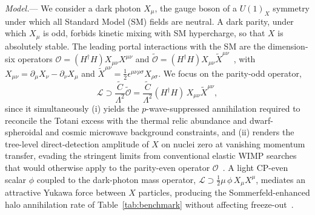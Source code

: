 \documentclass[aps,prl,twocolumn,superscriptaddress,nofootinbib]{revtex4-2}
\begin{document}
\textit{Model.}---%
We consider a dark photon $X_\mu$, the gauge boson of a $U(1)_X$ symmetry
under which all Standard Model (SM) fields are neutral. A dark parity,
under which $X_\mu$ is odd, forbids kinetic mixing with SM hypercharge, so
that $X$ is absolutely stable. The leading portal interactions with the SM
are the dimension-six operators $\mathcal{O}=(H^\dagger
H)X_{\mu\nu}X^{\mu\nu}$ and $\tilde{\mathcal
O}=(H^\dagger H)X_{\mu\nu}\tilde X^{\mu\nu}$~\cite{Yamashita2024}, with
$X_{\mu\nu}=\partial_\mu X_\nu-\partial_\nu X_\mu$ and
$\tilde X^{\mu\nu}=\frac12\epsilon^{\mu\nu\rho\sigma}X_{\rho\sigma}$. We
focus on the parity-odd operator,
\begin{equation}
\mathcal{L}\supset\frac{\tilde C}{\Lambda^2}\tilde{\mathcal O}
=\frac{\tilde C}{\Lambda^2}(H^\dagger H)\,X_{\mu\nu}\tilde X^{\mu\nu},
\label{eq:portal}
\end{equation}
since it simultaneously (i) yields the $p$-wave-suppressed annihilation
required to reconcile the Totani excess with the thermal relic abundance
and dwarf-spheroidal and cosmic microwave background constraints, and
(ii) renders the tree-level direct-detection amplitude of $X$ on nuclei
zero at vanishing momentum transfer, evading the stringent limits from
conventional elastic WIMP searches that would otherwise apply to the
parity-even operator $\mathcal{O}$~\cite{Yamashita2024}. A light CP-even
scalar $\phi$
coupled to the dark-photon mass operator,
$\mathcal{L}\supset\frac12\mu\,\phi\,X_\mu X^\mu$, mediates an attractive
Yukawa force between $X$ particles, producing the Sommerfeld-enhanced
halo annihilation rate of Table~\ref{tab:benchmark} without affecting
freeze-out~\cite{Yamashita2026}.
\end{document}
